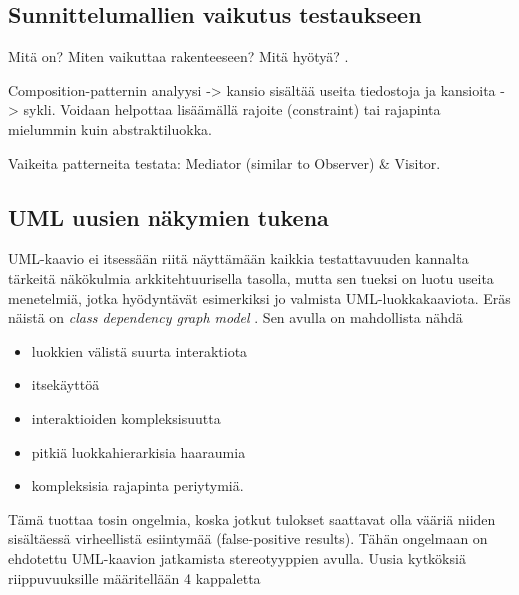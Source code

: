 \documentclass[finnish]{tktltiki2}
\theoremstyle{definition}
\theoremstyle{remark}
\begin{document}
\subsection{Sunnittelumallien vaikutus testaukseen}

Mitä on? Miten vaikuttaa rakenteeseen? Mitä  hyötyä? \citep{baudry_measuring_2003}.


Composition-patternin analyysi -> kansio sisältää useita tiedostoja ja kansioita -> sykli. Voidaan helpottaa lisäämällä rajoite (constraint) tai rajapinta mielummin kuin abstraktiluokka. 

Vaikeita patterneita testata: Mediator (similar to Observer) \& Visitor.

\subsection{UML uusien näkymien tukena}


UML-kaavio ei itsessään riitä näyttämään kaikkia testattavuuden kannalta tärkeitä näkökulmia arkkitehtuurisella tasolla, mutta sen tueksi on luotu useita menetelmiä, jotka hyödyntävät esimerkiksi jo valmista UML-luokkakaaviota. Eräs näistä on \textit{class dependency graph model} \citep[s. 4]{baudry_testability_2002}. Sen avulla on mahdollista nähdä 

\begin{itemize}
	\item luokkien välistä suurta interaktiota
	\item itsekäyttöä
	\item interaktioiden kompleksisuutta
	\item pitkiä luokkahierarkisia haaraumia
	\item kompleksisia rajapinta periytymiä.
\end{itemize}



Tämä tuottaa tosin ongelmia, koska jotkut tulokset saattavat olla vääriä niiden sisältäessä virheellistä esiintymää (false-positive results). Tähän ongelmaan on ehdotettu UML-kaavion jatkamista stereotyyppien avulla. Uusia kytköksiä riippuvuuksille määritellään 4 kappaletta \citep[s. 4]{baudry_measuring_2003}
\end{document}
